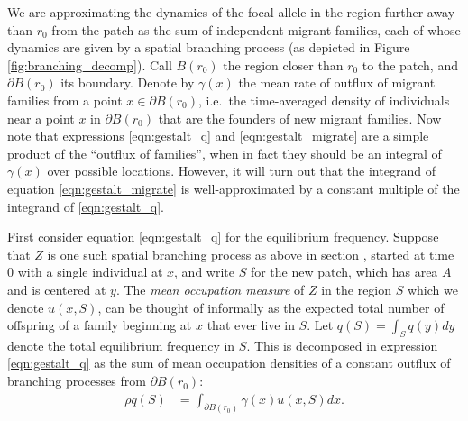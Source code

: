 \documentclass{article}
\newcommand{\linelabel}[1]{}
\newcommand{\E}{\mathbb{E}}
\newcommand{\secref}[1]{{\emph{\nameref{#1}}}}
\begin{document}
We are approximating the dynamics of the focal allele in the region further away than $r_0$ from the patch
as the sum of independent migrant families, each of whose dynamics are
given by a spatial branching process (as depicted in Figure \ref{fig:branching_decomp}).
Call $B(r_0)$ the region closer than $r_0$ to the patch, and $\partial B(r_0)$ its boundary.
Denote by $\gamma(x)$ the mean rate of outflux of migrant families from a point $x \in \partial B(r_0)$,
i.e.\ the time-averaged density of individuals near a point $x$ in $\partial B(r_0)$ 
that are the founders of new migrant families.
Now note that expressions \eqref{eqn:gestalt_q} and \eqref{eqn:gestalt_migrate} are a simple product of the ``outflux of families'',
when in fact they should be an integral of $\gamma(x)$ over possible locations. \linelabel{rr:awkward}
However,
it will turn out that the integrand of equation \eqref{eqn:gestalt_migrate} 
is well-approximated by a constant multiple of the integrand of \eqref{eqn:gestalt_q}.

First consider equation \eqref{eqn:gestalt_q} for the equilibrium frequency.
Suppose that $Z$ is one such spatial branching process as above in section \secref{ss:migrant_math}, 
started at time 0 with a single individual at $x$,
and write $S$ for the new patch, which has area $A$ and is centered at $y$.
The \emph{mean occupation measure} of $Z$ in the region $S$
which we denote $u(x,S)$,
can be thought of informally \linelabel{rr:density}
as the expected total number of offspring of a family beginning at $x$ that ever live in $S$.
Let $q(S) = \int_S q(y) dy$ denote the total equilibrium frequency in $S$.
This is decomposed in expression \eqref{eqn:gestalt_q} 
as the sum of mean occupation densities of a constant outflux of branching processes
from $\partial B(r_0)$:
\begin{align} \label{eqn:occupation_integral}
    \rho q(S) &= \int_{\partial B(r_0)} \gamma(x) u(x,S) dx  . 
\end{align}
\end{document}
